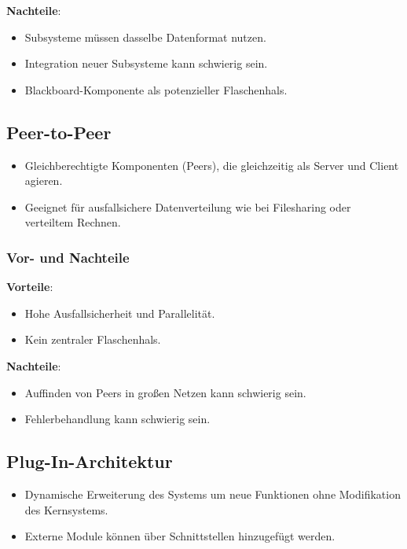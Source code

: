 \documentclass[11pt, a4paper]{article}
\begin{document}
\textbf{Nachteile}:
\begin{itemize}
    \item Subsysteme müssen dasselbe Datenformat nutzen.
    \item Integration neuer Subsysteme kann schwierig sein.
    \item Blackboard-Komponente als potenzieller Flaschenhals.
\end{itemize}


\subsection{Peer-to-Peer}

\begin{itemize}
    \item Gleichberechtigte Komponenten (Peers), die gleichzeitig als Server und Client agieren.
    \item Geeignet für ausfallsichere Datenverteilung wie bei Filesharing oder verteiltem Rechnen.
\end{itemize}

\subsubsection{Vor- und Nachteile}
\textbf{Vorteile}:
\begin{itemize}
    \item Hohe Ausfallsicherheit und Parallelität.
    \item Kein zentraler Flaschenhals.
\end{itemize}

\textbf{Nachteile}:
\begin{itemize}
    \item Auffinden von Peers in großen Netzen kann schwierig sein.
    \item Fehlerbehandlung kann schwierig sein.
\end{itemize}



\subsection{Plug-In-Architektur}

\begin{itemize}
    \item Dynamische Erweiterung des Systems um neue Funktionen ohne Modifikation des Kernsystems.
    \item Externe Module können über Schnittstellen hinzugefügt werden.
\end{itemize}
\end{document}
